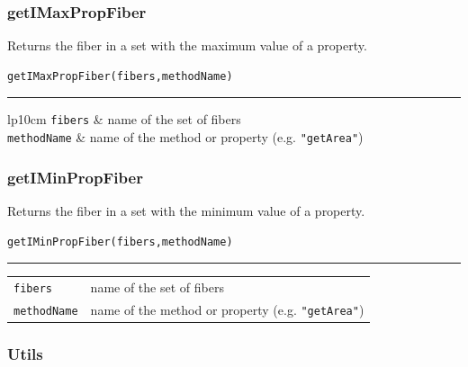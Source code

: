 \subsubsection{getIMaxPropFiber}
Returns the fiber in a set with the maximum value of a property.
\noindent 
\begin{verbatim}
getIMaxPropFiber(fibers,methodName)
\end{verbatim}
\vspace{-10pt}
{\color{grayLines} \rule{\linewidth}{0.25pt}}
\begin{center}
\begin{tabular}{lp{10cm}}
{\tt fibers} & name of the set of fibers \\
{\tt methodName} & name of the method or property (e.g. {\tt "getArea"}) \\
\end{tabular}
\end{center}

\subsubsection{getIMinPropFiber}
Returns the fiber in a set with the minimum value of a property.
\noindent 
\begin{verbatim}
getIMinPropFiber(fibers,methodName)
\end{verbatim}
\vspace{-10pt}
{\color{grayLines} \rule{\linewidth}{0.25pt}}
\begin{center}
\begin{tabular}{lp{10cm}}
{\tt fibers} & name of the set of fibers \\
{\tt methodName} & name of the method or property (e.g. {\tt "getArea"}) \\
\end{tabular}
\end{center}


\subsubsection{Utils}

